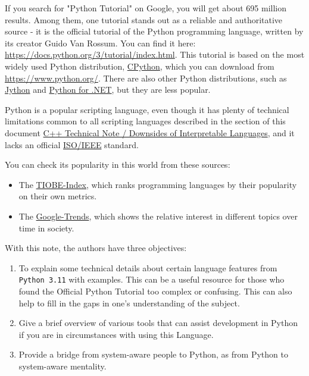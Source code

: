 \documentclass[
]{article}
\begin{document}
If you search for "Python Tutorial" on Google, you will get about 695
million results. Among them, one tutorial stands out as a reliable and
authoritative source - it is the official tutorial of the Python
programming language, written by its creator Guido Van Rossum. You can
find it here: \url{https://docs.python.org/3/tutorial/index.html}. This
tutorial is based on the most widely used Python distribution,
\href{https://www.python.org/}{CPython}, which you can download from
\url{https://www.python.org/}. There are also other Python
distributions, such as \href{https://www.jython.org/}{Jython} and
\href{https://pythonnet.github.io/}{Python for .NET}, but they are less
popular.

Python is a popular scripting language, even though it has plenty of
technical limitations common to all scripting languages described in the
section of this document
\href{https://github.com/burlachenkok/CPP_from_1998_to_2020/blob/main/Cpp-Technical-Note.md\#downsides-of-interpretable-languages}{C++
Technical Note / Downsides of Interpretable Languages}, and it lacks an
official \href{https://www.iso.org}{ISO/IEEE} standard.

You can check its popularity in this world from these sources:

\begin{itemize}
\item
  The \href{https://www.tiobe.com/tiobe-index/}{TIOBE-Index}, which
  ranks programming languages by their popularity on their own metrics.
\item
  The
  \href{https://trends.google.com/trends/explore?date=now\%201-d\&q=\%2Fm\%2F05z1_,\%2Fm\%2F0jgqg,C\%23,\%2Fm\%2F07sbkfb,BASH\&hl=r}{Google-Trends},
  which shows the relative interest in different topics over time in
  society.
\end{itemize}

With this note, the authors have three objectives:

\begin{enumerate}
\def\labelenumi{\arabic{enumi}.}
\item
  To explain some technical details about certain language features from
  \texttt{Python\ 3.11} with examples. This can be a useful resource for
  those who found the Official Python Tutorial too complex or confusing.
  This can also help to fill in the gaps in one's understanding of the
  subject.
\item
  Give a brief overview of various tools that can assist development in
  Python if you are in circumstances with using this Language.
\item
  Provide a bridge from system-aware people to Python, as from Python to
  system-aware mentality.
\end{enumerate}
\end{document}
